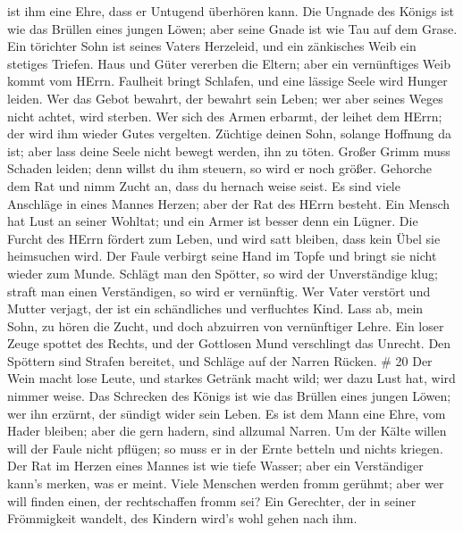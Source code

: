 ist ihm eine Ehre, dass er Untugend überhören kann.  Die
Ungnade des Königs ist wie das Brüllen eines jungen Löwen; aber seine
Gnade ist wie Tau auf dem Grase.  Ein törichter Sohn ist
seines Vaters Herzeleid, und ein zänkisches Weib ein stetiges Triefen.
 Haus und Güter vererben die Eltern; aber ein vernünftiges
Weib kommt vom HErrn.  Faulheit bringt Schlafen, und eine
lässige Seele wird Hunger leiden.  Wer das Gebot bewahrt,
der bewahrt sein Leben; wer aber seines Weges nicht achtet, wird
sterben.  Wer sich des Armen erbarmt, der leihet dem HErrn;
der wird ihm wieder Gutes vergelten.  Züchtige deinen Sohn,
solange Hoffnung da ist; aber lass deine Seele nicht bewegt werden, ihn
zu töten.  Großer Grimm muss Schaden leiden; denn willst du
ihm steuern, so wird er noch größer.  Gehorche dem Rat und
nimm Zucht an, dass du hernach weise seist.  Es sind viele
Anschläge in eines Mannes Herzen; aber der Rat des HErrn besteht.
 Ein Mensch hat Lust an seiner Wohltat; und ein Armer ist
besser denn ein Lügner.  Die Furcht des HErrn fördert zum
Leben, und wird satt bleiben, dass kein Übel sie heimsuchen wird.
 Der Faule verbirgt seine Hand im Topfe und bringt sie
nicht wieder zum Munde.  Schlägt man den Spötter, so wird
der Unverständige klug; straft man einen Verständigen, so wird er
vernünftig.  Wer Vater verstört und Mutter verjagt, der ist
ein schändliches und verfluchtes Kind.  Lass ab, mein Sohn,
zu hören die Zucht, und doch abzuirren von vernünftiger Lehre.
 Ein loser Zeuge spottet des Rechts, und der Gottlosen Mund
verschlingt das Unrecht.  Den Spöttern sind Strafen
bereitet, und Schläge auf der Narren Rücken. \# 20  Der Wein
macht lose Leute, und starkes Getränk macht wild; wer dazu Lust hat,
wird nimmer weise.  Das Schrecken des Königs ist wie das
Brüllen eines jungen Löwen; wer ihn erzürnt, der sündigt wider sein
Leben.  Es ist dem Mann eine Ehre, vom Hader bleiben; aber
die gern hadern, sind allzumal Narren.  Um der Kälte willen
will der Faule nicht pflügen; so muss er in der Ernte betteln und nichts
kriegen.  Der Rat im Herzen eines Mannes ist wie tiefe
Wasser; aber ein Verständiger kann's merken, was er meint. 
Viele Menschen werden fromm gerühmt; aber wer will finden einen, der
rechtschaffen fromm sei?  Ein Gerechter, der in seiner
Frömmigkeit wandelt, des Kindern wird's wohl gehen nach ihm.
